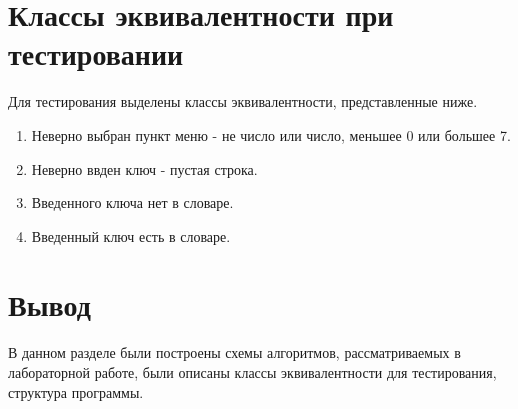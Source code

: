 \clearpage


\section{Классы эквивалентности при тестировании}

Для тестирования выделены классы эквивалентности, представленные ниже.

\begin{enumerate}
	\item Неверно выбран пункт меню - не число или число, меньшее 0 или большее 7.
	\item Неверно ввден ключ - пустая строка.
	\item Введенного ключа нет в словаре.
	\item Введенный ключ есть в словаре.
\end{enumerate}


\section{Вывод}

В данном разделе были построены схемы алгоритмов, рассматриваемых в лабораторной работе, были описаны классы эквивалентности для тестирования, структура программы.
